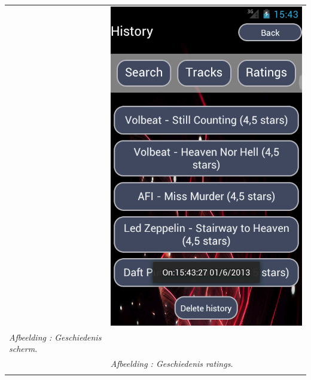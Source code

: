 \documentclass[11pt,a4paper]{article}
\newcounter{figc}
\newcommand{\increaseFigID} {%
   \stepcounter{figc}%
   \thefigc}
\newcommand{\figID}[1]{\small \textit{Afbeelding \increaseFigID : #1} \\ \normalsize}
\begin{document}
{\begin{tabular} {p{7cm} >{\centering\arraybackslash}p{7cm}@{\hskip 0.5in}}
		& \includegraphics[scale=0.28]{Pictures/device-2013-05-31-202339000.png} \\
		
		\centering \figID{Geschiedenis scherm.}  
		&  \figID{Geschiedenis ratings.} 
		\vspace{1pt} & \vspace{1pt} \\
		

\end{tabular}}
\end{document}
